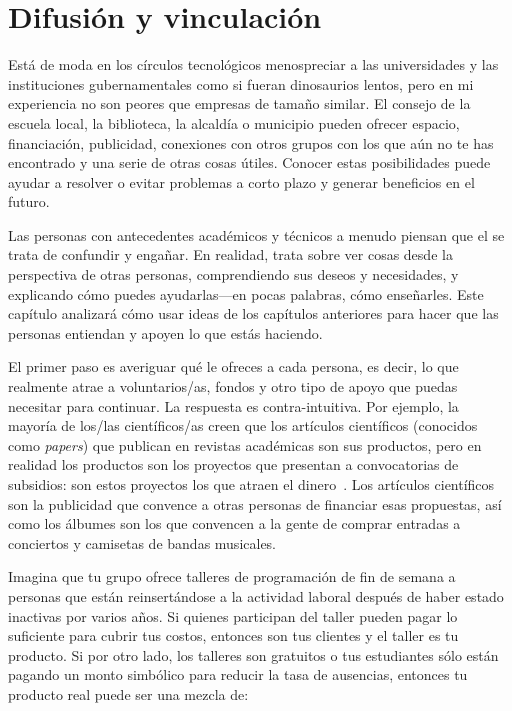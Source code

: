 \chapter{Difusión y vinculación}\label{s:outreach}


Está de moda en los círculos tecnológicos 
menospreciar a las universidades y las instituciones gubernamentales como si fueran dinosaurios lentos, 
pero en mi experiencia no son peores que empresas de tamaño similar.
El consejo de la escuela local, la biblioteca, la alcaldía o municipio pueden ofrecer espacio, 
financiación, publicidad, conexiones con otros grupos con los que aún no te has encontrado 
y una serie de otras cosas útiles. 
Conocer estas posibilidades puede ayudar a resolver o evitar problemas a corto plazo 
y generar beneficios en el futuro.


Las personas con antecedentes académicos y técnicos a menudo piensan que 
el  se trata de confundir y engañar. 
En realidad, trata sobre ver cosas desde la perspectiva de otras personas, 
comprendiendo sus deseos y necesidades, y explicando cómo puedes ayudarlas---en pocas palabras, 
cómo enseñarles.
Este capítulo analizará cómo usar ideas de los capítulos anteriores 
para hacer que las personas entiendan y apoyen lo que estás haciendo.

El primer paso es averiguar qué le ofreces a cada persona, es decir, 
lo que realmente atrae a voluntarios/as, fondos y otro tipo de apoyo que puedas necesitar para continuar.
La respuesta es contra-intuitiva.
Por ejemplo, la mayoría de los/las científicos/as creen 
que los artículos científicos (conocidos como \emph{papers}) 
que publican en revistas académicas son sus productos, 
pero en realidad los productos son los proyectos que presentan a convocatorias de subsidios: 
son estos proyectos los que atraen el dinero~\cite{Kuch2011}.
Los artículos científicos son la publicidad que convence a otras personas de financiar esas propuestas, 
así como los álbumes son los que convencen a la gente de comprar entradas a conciertos y camisetas de bandas musicales.

Imagina que tu grupo ofrece talleres de programación de fin de semana 
a personas que están reinsertándose a la actividad laboral después de haber estado inactivas por varios años.
Si quienes participan del taller pueden pagar lo suficiente para cubrir tus costos, 
entonces son tus clientes y el taller es tu producto. Si por otro lado, los talleres son gratuitos 
o tus estudiantes sólo están pagando un monto simbólico para reducir la tasa de ausencias, 
entonces tu producto real puede ser una mezcla de: 

